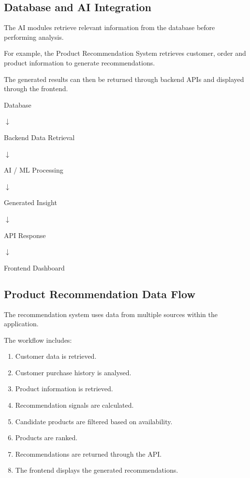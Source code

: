 \documentclass[12pt,a4paper]{report}
\begin{document}
\subsection{Database and AI Integration}

The AI modules retrieve relevant information from the database before
performing analysis.

For example, the Product Recommendation System retrieves customer,
order and product information to generate recommendations.

The generated results can then be returned through backend APIs and
displayed through the frontend.

\begin{center}

Database

$\downarrow$

Backend Data Retrieval

$\downarrow$

AI / ML Processing

$\downarrow$

Generated Insight

$\downarrow$

API Response

$\downarrow$

Frontend Dashboard

\end{center}


\subsection{Product Recommendation Data Flow}

The recommendation system uses data from multiple sources within the
application.

The workflow includes:

\begin{enumerate}
    \item Customer data is retrieved.
    \item Customer purchase history is analysed.
    \item Product information is retrieved.
    \item Recommendation signals are calculated.
    \item Candidate products are filtered based on availability.
    \item Products are ranked.
    \item Recommendations are returned through the API.
    \item The frontend displays the generated recommendations.
\end{enumerate}
\end{document}
